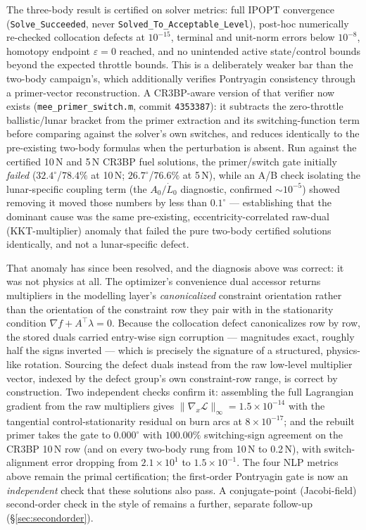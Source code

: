 \documentclass[11pt]{article}
\begin{document}
The three-body result is certified on solver metrics: full IPOPT
convergence (\texttt{Solve\_Succeeded}, never
\texttt{Solved\_To\_Acceptable\_Level}), post-hoc numerically re-checked
collocation defects at $10^{-15}$, terminal and unit-norm errors below
$10^{-8}$, homotopy endpoint $\varepsilon = 0$ reached, and no unintended
active state/control bounds beyond the expected throttle bounds. This is a
deliberately weaker bar than the two-body campaign's, which additionally
verifies Pontryagin consistency through a primer-vector reconstruction. A
CR3BP-aware version of that verifier now exists
(\texttt{mee\_primer\_switch.m}, commit \texttt{4353387}): it subtracts
the zero-throttle ballistic/lunar bracket from the primer extraction and
its switching-function term before comparing against the solver's own
switches, and reduces identically to the pre-existing two-body formulas
when the perturbation is absent. Run against the certified 10\,N and 5\,N
CR3BP fuel solutions, the primer/switch gate initially \emph{failed}
($32.4^\circ$/$78.4\%$ at 10\,N; $26.7^\circ$/$76.6\%$ at 5\,N), while an
A/B check isolating the lunar-specific coupling term (the
$A_0/\dot L_0$ diagnostic, confirmed $\sim 10^{-5}$) showed removing it
moved those numbers by less than $0.1^\circ$ --- establishing that the
dominant cause was the same pre-existing, eccentricity-correlated raw-dual
(KKT-multiplier) anomaly that failed the pure two-body certified solutions
identically, and not a lunar-specific defect.

That anomaly has since been resolved, and the diagnosis above was correct:
it was not physics at all. The optimizer's convenience dual accessor returns
multipliers in the modelling layer's \emph{canonicalized} constraint
orientation rather than the orientation of the constraint row they pair with
in the stationarity condition $\nabla f + A^{\!\top}\lambda = 0$. Because the
collocation defect canonicalizes row by row, the stored duals carried
entry-wise sign corruption --- magnitudes exact, roughly half the signs
inverted --- which is precisely the signature of a structured, physics-like
rotation. Sourcing the defect duals instead from the raw low-level multiplier
vector, indexed by the defect group's own constraint-row range, is correct by
construction. Two independent checks confirm it: assembling the full
Lagrangian gradient from the raw multipliers gives
$\lVert\nabla_x\mathcal{L}\rVert_\infty = 1.5\times10^{-14}$ with the
tangential control-stationarity residual on burn arcs at $8\times10^{-17}$;
and the rebuilt primer takes the gate to $0.000^\circ$ with $100.00\%$
switching-sign agreement on the CR3BP 10\,N row (and on every two-body rung
from 10\,N to 0.2\,N), with switch-alignment error dropping from
$2.1\times10^{1}$ to $1.5\times10^{-1}$. The four NLP metrics above remain
the primal certification; the first-order Pontryagin gate is now an
\emph{independent} check that these solutions also pass. A conjugate-point
(Jacobi-field) second-order check in the style of \cite{BCP2010} remains a
further, separate follow-up (\S\ref{sec:secondorder}).
\end{document}
